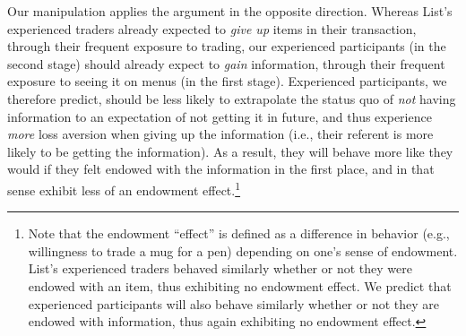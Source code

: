 Our manipulation applies the argument in the opposite direction. Whereas List’s experienced traders already expected to \emph{give up} items in their transaction, through their frequent exposure to trading, our experienced participants (in the second stage) should already expect to \emph{gain} information, through their frequent exposure to seeing it on menus (in the first stage). Experienced participants, we therefore predict, should be less likely to extrapolate the status quo of \emph{not} having information to an expectation of not getting it in future, and thus experience \emph{more} loss aversion when giving up the information (i.e., their referent is more likely to be getting the information). As a result, they will behave more like they would if they felt endowed with the information in the first place, and in that sense exhibit less of an endowment effect.\footnote{Note that the endowment \enquote{effect} is defined as a difference in behavior (e.g., willingness to trade a mug for a pen) depending on one’s sense of endowment. List’s experienced traders behaved similarly whether or not they were endowed with an item, thus exhibiting no endowment effect. We predict that experienced participants will also behave similarly whether or not they are endowed with information, thus again exhibiting no endowment effect.}

